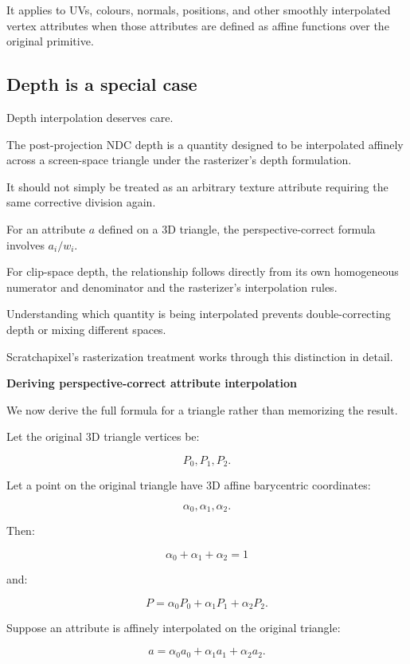 It applies to UVs, colours, normals, positions, and other smoothly interpolated vertex attributes when those attributes are defined as affine functions over the original primitive.

\subsection{Depth is a special case}\label{02-foundations-ii-ch034-depth-is-a-special-case}

Depth interpolation deserves care.

The post-projection NDC depth is a quantity designed to be interpolated affinely across a screen-space triangle under the rasterizer's depth formulation.

It should not simply be treated as an arbitrary texture attribute requiring the same corrective division again.

For an attribute \(a\) defined on a 3D triangle, the perspective-correct formula involves \(a_i/w_i\).

For clip-space depth, the relationship follows directly from its own homogeneous numerator and denominator and the rasterizer's interpolation rules.

Understanding which quantity is being interpolated prevents double-correcting depth or mixing different spaces.

Scratchapixel's rasterization treatment works through this distinction in detail. 

\textbf{Deriving perspective-correct attribute interpolation}

We now derive the full formula for a triangle rather than memorizing the result.

Let the original 3D triangle vertices be:

\[
 P_0,P_1,P_2.
\]

Let a point on the original triangle have 3D affine barycentric coordinates:

\[
 \alpha_0,\alpha_1,\alpha_2.
\]

Then:

\[
 \boxed{ \alpha_0+\alpha_1+\alpha_2=1 }
\]

and:

\[
 \boxed{ P=\alpha_0P_0+\alpha_1P_1+\alpha_2P_2 }.
\]

Suppose an attribute is affinely interpolated on the original triangle:

\[
 \boxed{ a=\alpha_0a_0+\alpha_1a_1+\alpha_2a_2 }.
\]

